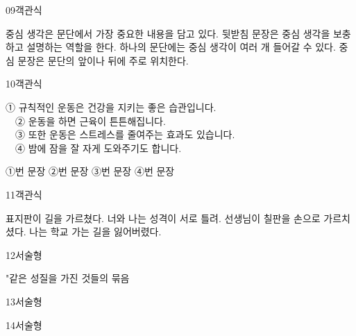 \documentclass[fs11,seriesFre]{korfarm-base}
\begin{document}
\begin{kfQBlock}{09}{객관식}
\begin{kfChoices}
\kfChoice 중심 생각은 문단에서 가장 중요한 내용을 담고 있다.
\kfChoice 뒷받침 문장은 중심 생각을 보충하고 설명하는 역할을 한다.
\kfChoice 하나의 문단에는 중심 생각이 여러 개 들어갈 수 있다.
\kfChoice 중심 문장은 문단의 앞이나 뒤에 주로 위치한다.
\end{kfChoices}
\end{kfQBlock}

\begin{kfQBlock}{10}{객관식}
\begin{kfEvidence}① 규칙적인 운동은 건강을 지키는 좋은 습관입니다. \\\relax
　② 운동을 하면 근육이 튼튼해집니다. \\\relax
　③ 또한 운동은 스트레스를 줄여주는 효과도 있습니다. \\\relax
　④ 밤에 잠을 잘 자게 도와주기도 합니다.\end{kfEvidence}
\begin{kfChoices}
\kfChoice ①번 문장
\kfChoice ②번 문장
\kfChoice ③번 문장
\kfChoice ④번 문장
\end{kfChoices}
\end{kfQBlock}

\begin{kfQBlock}{11}{객관식}
\begin{kfChoices}
\kfChoice 표지판이 길을 가르쳤다.
\kfChoice 너와 나는 성격이 서로 틀려.
\kfChoice 선생님이 칠판을 손으로 가르치셨다.
\kfChoice 나는 학교 가는 길을 잃어버렸다.
\end{kfChoices}
\end{kfQBlock}

\begin{kfQBlock}{12}{서술형}
\begin{kfEvidence}"같은 성질을 가진 것들의 묶음\end{kfEvidence}
\end{kfQBlock}

\begin{kfQBlock}{13}{서술형}
\end{kfQBlock}

\begin{kfQBlock}{14}{서술형}
\end{kfQBlock}
\end{document}
